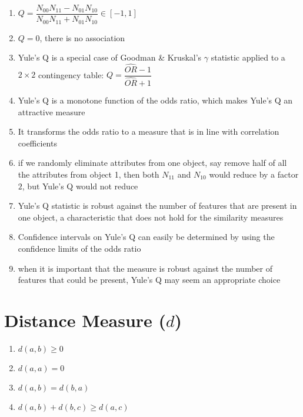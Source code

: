 \begin{enumerate}
    \item[] $Q = \dfrac{N_{00}N_{11} - N_{01}N_{10}}{N_{00}N_{11} + N_{01}N_{10}} \in [-1,1]$

    \item $Q = 0$, there is no association

    \item Yule’s Q is a special case of Goodman \& Kruskal’s $\gamma$ statistic applied to a $2 \times 2$ contingency table: $Q = \dfrac{\hat{OR} - 1}{\hat{OR} + 1}$

    \item Yule’s Q is a monotone function of the odds ratio, which makes Yule’s Q an attractive measure

    \item It transforms the odds ratio to a measure that is in line with correlation coefficients

    \item if we randomly eliminate attributes from one object, say remove half of all the attributes from object 1, then both $N_{11}$ and $N_{10}$ would reduce by a factor $2$, but Yule’s Q would not reduce

    \item Yule’s Q statistic is robust against the number of features that are present in one object, a characteristic that does not hold for the similarity measures

    \item Confidence intervals on Yule’s Q can easily be determined by using the confidence limits of the odds ratio

    \item when it is important that the measure is robust against the number of features that could be present, Yule’s Q may seem an appropriate choice
\end{enumerate}

\section{Distance Measure ($d$) \cite{ism-1}}

\begin{enumerate}
    \item $d(a, b) \geq 0$

    \item $d(a, a) = 0$

    \item $d(a, b) = d(b, a)$

    \item $d(a, b) + d(b, c) \geq d(a, c)$
\end{enumerate}



